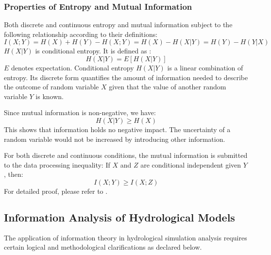 \documentclass[11pt]{article}
\begin{document}
 
\subsubsection{Properties of Entropy and Mutual Information}
Both discrete and continuous entropy and mutual information subject to the following relationship according to their definitions:
\begin{equation}
I(X;Y)=H(X)+H(Y)-H(X;Y)=H(X)-H(X|Y)=H(Y)-H(Y|X)
\end{equation}
$H(X|Y)$ is conditional entropy. It is defined as :
\begin{equation}
H(X|Y)=E[H(X|Y)]
\end{equation}
$E$ denotes expectation. Conditional entropy $H(X|Y)$ is a linear combination of entropy. Its discrete form quantifies the amount of information needed to describe the outcome of  random variable $X$ given that the value of another random variable $Y$ is known.

Since mutual information is non-negative, we have:
\begin{equation}
H(X|Y)\geq H(X)
\end{equation}
This shows that information holds no negative impact. The uncertainty of a random variable would not be increased by introducing other information. 

For both discrete and continuous conditions, the mutual information  is submitted to the data processing inequality:
If $X$ and $Z$ are conditional independent given $Y$, then:
\begin{equation}
I(X;Y) \geq I(X;Z)
\end{equation}
For detailed proof, please refer to \cite{cover2012elements}.



\subsection{Information Analysis of Hydrological Models}

The application of information theory in hydrological simulation analysis requires certain logical and methodological clarifications as declared below. 




\end{document}
